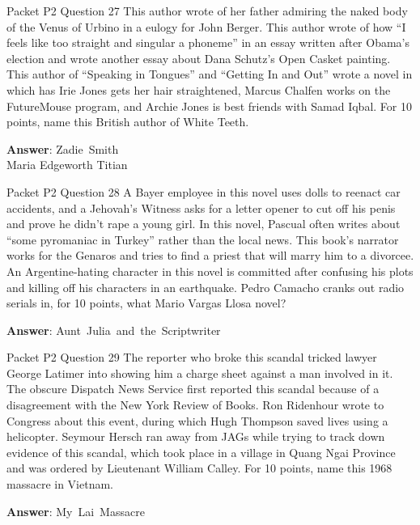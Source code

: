\begin{frame}{Packet P2 Question 27}
This author wrote of her   father admiring the naked body of the Venus of Urbino in   a eulogy for John Berger. This author wrote of how “I feels like too straight and singular a phoneme” in an essay written after Obama’s election and wrote another essay about Dana Schutz's Open Casket painting. This author of ``Speaking in Tongues'' and ``Getting In and Out'' wrote a novel in which has Irie Jones gets her hair straightened, Marcus Chalfen works   on the FutureMouse program, and Archie Jones is best friends with Samad Iqbal. For       10 points, name this British author of White Teeth.

\textbf{Answer}: Zadie\ Smith\\
 Maria Edgeworth
 Titian
\end{frame}

\begin{frame}{Packet P2 Question 28}
A Bayer employee in this novel uses dolls to reenact car accidents, and a Jehovah's Witness asks for a letter opener to cut off his penis and prove he didn’t rape a young girl. In this novel, Pascual often writes about ``some pyromaniac in Turkey'' rather than the local news. This book’s narrator works for the Genaros and tries to find a priest that will marry him   to a divorcee. An   Argentine-hating character in this novel is committed after confusing his plots and killing off his characters in an earthquake. Pedro Camacho cranks out radio   serials in, for 10 points, what Mario Vargas   Llosa novel?

\textbf{Answer}: Aunt\ Julia\ and\ the\ Scriptwriter\\
\end{frame}

\begin{frame}{Packet P2 Question 29}
The reporter who broke this scandal tricked lawyer George Latimer into showing him a charge sheet against a man involved in it. The obscure Dispatch News Service first reported this scandal because of a disagreement with the New York Review of Books. Ron Ridenhour wrote to Congress about this event, during which Hugh Thompson   saved lives using a helicopter. Seymour   Hersch ran away from JAGs while trying to track down evidence of this scandal, which took place in a village in Quang Ngai Province and was ordered by Lieutenant William Calley.   For 10 points, name this 1968 massacre in Vietnam.  

\textbf{Answer}: My\ Lai\ Massacre\\
\end{frame}

